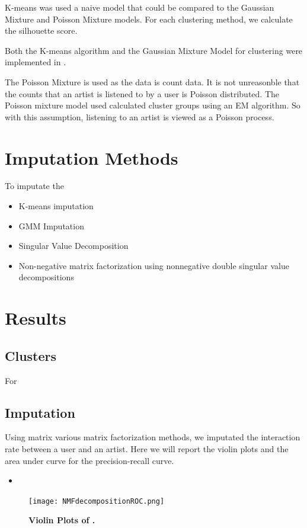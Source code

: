 \documentclass{article} %
\begin{document}
K-means was used a naive model that could be compared to the Gaussian Mixture and Poisson Mixture models. For each clustering method, we calculate the silhouette score. 

Both the K-means algorithm and the Gaussian Mixture Model for clustering were implemented in \cite{scikit-learn}. 

The Poisson Mixture is used as the data is count data. It is not unreasonble that the counts that an artist is listened to by a user is Poisson distributed. The Poisson mixture model used calculated cluster groups using an EM algorithm. So with this assumption, listening to an artist is viewed as a Poisson process. 

\section{Imputation Methods}
To imputate the 

\begin{itemize}
    \item K-means imputation
    \item GMM Imputation
    \item Singular Value Decomposition
    \item Non-negative matrix factorization using nonnegative double singular value decompositions
\end{itemize}
\section{Results}



\subsection{Clusters}
For

\subsection{Imputation}
Using matrix various matrix factorization methods, we imputated the interaction rate between a user and an artist. Here we will report the violin plots and the area under curve for the precision-recall curve. 

\begin{itemize}
    \item 
\end{itemize}

\begin{figure}
\centering
\texttt{[image: NMFdecompositionROC.png]}
\caption{\textbf{Violin Plots of .}  }
\label{fig:ROCNMF}
\end{figure}
\end{document}
